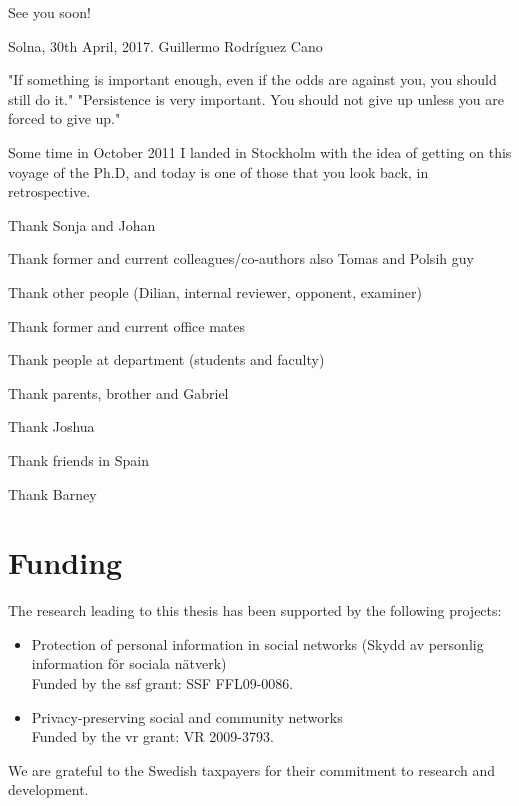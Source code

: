 See you soon!

Solna, 30th April, 2017.
Guillermo Rodríguez Cano

"If something is important enough, even if the odds are against you, you should still do it."
"Persistence is very important. You should not give up unless you are forced to give up."

Some time in October 2011 I landed in Stockholm with the idea of getting on this 
voyage of the Ph.D, and today is one of those that you look back, in retrospective.

Thank Sonja and Johan

Thank former and current colleagues/co-authors also Tomas and Polsih guy

Thank other people (Dilian, internal reviewer, opponent, examiner)

Thank former and current office mates

Thank people at department (students and faculty)

Thank parents, brother and Gabriel

Thank Joshua

Thank friends in Spain

Thank Barney


\section*{Funding}
The research leading to this thesis has been supported by the following projects:
\begin{itemize}
    \item Protection of personal information in social networks (Skydd av personlig 
    information f{\"o}r sociala n{\"a}tverk)\\
    Funded by the \ac*{ssf} grant: SSF FFL09-0086.
    \item Privacy-preserving social and community networks\\
    Funded by the \ac*{vr} grant: VR 2009-3793.
\end{itemize}

We are grateful to the Swedish taxpayers for their commitment to research and development.
